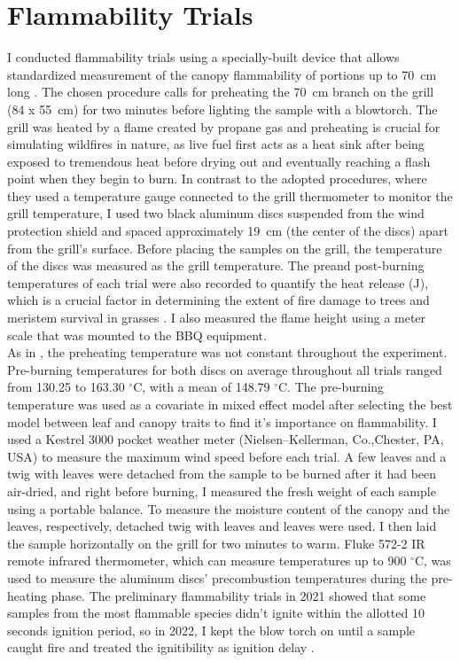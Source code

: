 \documentclass[12pt]{report}
\begin{document}
\section{Flammability Trials}

I conducted flammability trials using a specially-built device that allows standardized measurement of the canopy flammability of portions up to 70 \,cm long \citep{jaureguiberry2011device}. The chosen procedure calls for preheating the 70 \,cm branch on the grill (84 x 55 \,cm) for two minutes before lighting the sample with a blowtorch. The grill was heated by a flame created by propane gas and preheating is crucial for simulating wildfires in nature, as live fuel first acts as a heat sink after being exposed to tremendous heat before drying out and eventually reaching a flash point when they begin to burn. In contrast to the adopted procedures, where they used a temperature gauge connected to the grill thermometer to monitor the grill temperature, I used two black aluminum discs \citep{gao2022burn} suspended from the wind protection shield and spaced approximately 19 \,cm (the center of the discs) apart from the grill's surface. Before placing the samples on the grill, the temperature of the discs was measured as the grill temperature. The pre\-and post-burning temperatures of each trial were also recorded to quantify the heat release (J), which is a crucial factor in determining the extent of fire damage to trees and meristem survival in grasses \citep{bowman2018differential, choczynska2009soil}. I also measured the flame height using a meter scale that was mounted to the BBQ equipment.\\

As in \citep{wyse2016quantitative}, the preheating temperature was not constant throughout the experiment. Pre-burning temperatures for both discs on average throughout all trials ranged from 130.25 to 163.30 $^{\circ}$C, with a mean of 148.79 $^{\circ}$C. The pre-burning temperature was used as a covariate in mixed effect model after selecting the best model between leaf and canopy traits to find it's importance on flammability. I used a Kestrel 3000 pocket weather meter (Nielsen–Kellerman, Co.,Chester, PA, USA) to measure the maximum wind speed before each trial. A few leaves and a twig with leaves were detached from the sample to be burned after it had been air-dried, and right before burning, I measured the fresh weight of each sample using a portable balance. To measure the moisture content of the canopy and the leaves, respectively, detached twig with leaves and leaves were used. I then laid the sample horizontally on the grill for two minutes to warm. Fluke 572-2 IR remote infrared thermometer, which can measure temperatures up to 900 $^{\circ}$C, was used to measure the aluminum discs' precombustion temperatures during the pre-heating phase. The preliminary flammability trials in 2021 showed that some samples from the most flammable species didn't ignite within the allotted 10 seconds ignition period, so in 2022, I kept the blow torch on until a sample caught fire and treated the ignitibility as ignition delay \citep{anderson1970forest}.
\end{document}
